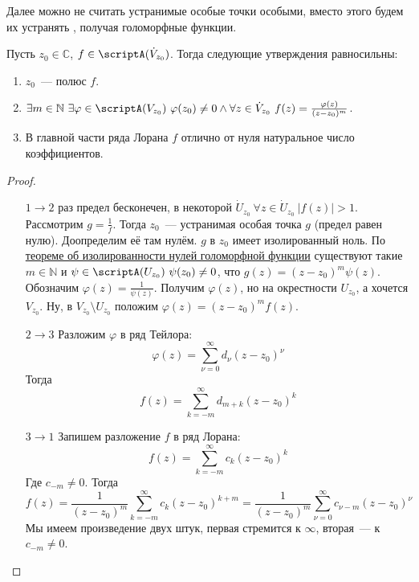 \documentclass{article}
\begin{document}
    \begin{remark}
        Далее можно не считать устранимые особые точки особыми, вместо этого будем их устранять , получая голоморфные функции.
    \end{remark}
    \begin{theorem}
        \label{Характеристика полюсов}
        Пусть $z_0\in\mathbb C$, $f\in\scriptA(\dot V_{z_0})$. Тогда следующие утверждения равносильны:
        \begin{enumerate}
            \item $z_0$~--- полюс $f$.
            \item $\exists m\in\mathbb N~\exists\varphi\in\scriptA(V_{z_0})~\varphi(z_0)\neq0\land \forall z\in\dot V_{z_0}~f(z)=\frac{\varphi(z)}{(z-z_0)^m}$.
            \item В главной части ряда Лорана $f$ отлично от нуля натуральное число коэффициентов.
        \end{enumerate}
    \end{theorem}
    \begin{proof}
        \begin{itemize}
            \item[$1\to2$] раз предел бесконечен, в некоторой $\dot U_{z_0}~\forall z\in\dot U_{z_0}~|f(z)|>1$. Рассмотрим $g=\frac1f$. Тогда $z_0$~--- устранимая особая точка $g$ (предел равен нулю). Доопределим её там нулём. $g$ в $z_0$ имеет изолированный ноль. По \hyperref[Изолированность нулей голоморфной функции]{теореме об изолированности нулей голоморфной функции} существуют такие $m\in\mathbb N$ и $\psi\in\scriptA(U_{z_0})~\psi(z_0)\neq0$, что $g(z)=(z-z_0)^m\psi(z)$. Обозначим $\varphi(z)=\frac1{\psi(z)}$. Получим $\varphi(z)$, но на окрестности $U_{z_0}$, а хочется $V_{z_0}$. Ну, в $V_{z_0}\setminus U_{z_0}$ положим $\varphi(z)=(z-z_0)^mf(z)$.
            \item[$2\to3$] Разложим $\varphi$ в ряд Тейлора:
            $$
            \varphi(z)=\sum\limits_{\nu=0}^\infty d_\nu(z-z_0)^\nu
            $$
            Тогда
            $$
            f(z)=\sum\limits_{k=-m}^\infty d_{m+k}(z-z_0)^k
            $$
            \item[$3\to1$] Запишем разложение $f$ в ряд Лорана:
            $$
            f(z)=\sum\limits_{k=-m}^\infty c_k(z-z_0)^k
            $$
            Где $c_{-m}\neq0$. Тогда
            $$
            f(z)=\frac1{(z-z_0)^m}\sum\limits_{k=-m}^\infty c_k(z-z_0)^{k+m}=\frac1{(z-z_0)^m}\sum\limits_{\nu=0}^\infty c_{\nu-m}(z-z_0)^{\nu}
            $$
            Мы имеем произведение двух штук, первая стремится к $\infty$, вторая~--- к $c_{-m}\neq0$.
        \end{itemize}
    \end{proof}
\end{document}

